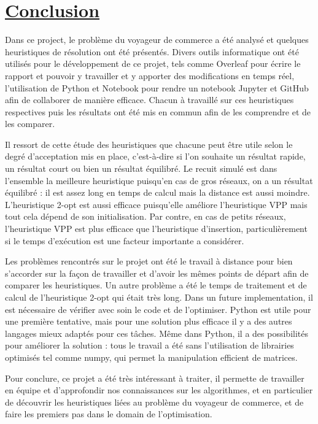 \documentclass[a4paper,11pt,fleqn]{article}
\begin{document}
\newpage

\section*{\underline{Conclusion}}
Dans ce project, le problème du voyageur de commerce a été analysé et quelques heuristiques de résolution ont été présentés. Divers outils informatique ont été utilisés pour le développement de ce projet, tels comme Overleaf pour écrire le rapport et pouvoir y travailler et y apporter des modifications en temps réel, l'utilisation de Python et Notebook pour rendre un notebook Jupyter et GitHub afin de collaborer de manière efficace. Chacun à travaillé sur ces heuristiques respectives puis les résultats ont été mis en commun afin de les comprendre et de les comparer.
\newline

Il ressort de cette étude des heuristiques que chacune peut être utile selon le degré d'acceptation mis en place, c'est-à-dire si l'on souhaite un résultat rapide, un résultat court ou bien un résultat équilibré. Le recuit simulé est dans l'ensemble la meilleure heuristique puisqu'en cas de gros réseaux, on a un résultat équilibré : il est assez long en temps de calcul mais la distance est aussi moindre. L'heuristique 2-opt est aussi efficace puisqu'elle améliore l'heuristique VPP mais tout cela dépend de son initialisation. Par contre, en cas de petits réseaux, l'heuristique VPP est plus efficace que l'heuristique d'insertion, particulièrement si le temps d'exécution est une facteur importante a considérer.
\newline

Les problèmes rencontrés sur le projet ont été le travail à distance pour bien s'accorder sur la façon de travailler et d'avoir les mêmes points de départ afin de comparer les heuristiques. Un autre problème a été le temps de traitement et de calcul de l'heuristique 2-opt qui était très long. Dans un future implementation, il est nécessaire de vérifier avec soin le code et de l'optimiser. Python est utile pour une première tentative, mais pour une solution plus efficace il y a des autres langages mieux adaptés pour ces tâches. Même dans Python, il a des possibilités pour améliorer la solution : tous le travail a été sans l'utilisation de librairies optimisés tel comme numpy, qui permet la manipulation efficient de matrices.
\newline

Pour conclure, ce projet a été très intéressant à traiter, il permette de travailler en équipe et d'approfondir nos connaissances sur les algorithmes, et en particulier de découvrir les heuristiques liées au problème du voyageur de commerce, et de faire les premiers pas dans le domain de l'optimisation.


\newpage


\end{document}
